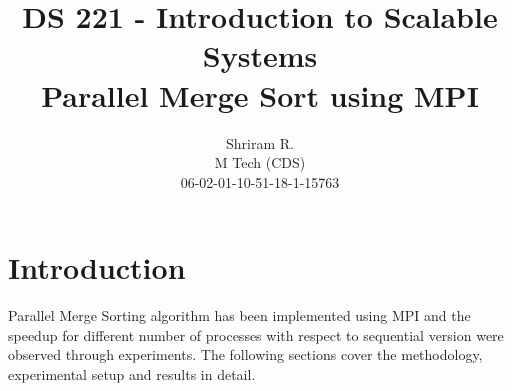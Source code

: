 \documentclass[11pt,a4paper,oneside]{article}
\begin{document}
	\title{DS 221 - Introduction to Scalable Systems \\ Parallel Merge Sort using MPI}
	\author{Shriram R. \\ M Tech (CDS) \\ 06-02-01-10-51-18-1-15763}
	\maketitle
	
	\section{Introduction}
    Parallel Merge Sorting algorithm has been implemented using MPI and the speedup for different number of processes with respect to sequential version were observed through experiments. The following sections cover the methodology, experimental setup and results in detail.
	
\end{document}
